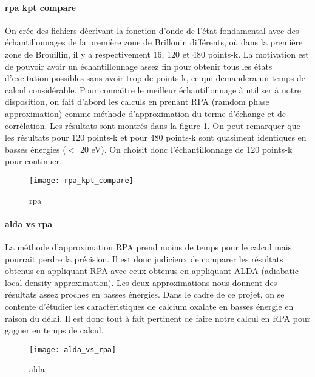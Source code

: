 
\paragraph{rpa kpt compare} 
On crée des fichiers décrivant la fonction d'onde de l'état fondamental avec des échantillonnages de la première zone de Brillouin différents, où dans la première zone de Brouillin, il y a respectivement 16, 120 et 480 points-k. 
La motivation est de pouvoir avoir un échantillonnage assez fin pour obtenir tous les états d'excitation possibles sans avoir trop de points-k, ce qui demandera un temps de calcul considérable.
Pour connaître le meilleur échantillonnage à utiliser à notre disposition, on fait d'abord les calculs en prenant RPA (ramdom phase approximation) comme méthode d'approximation du terme d'échange et de corrélation.
Les résultats sont montrés dans la figure \ref{kptCompare}. 
On peut remarquer que les résultats pour 120 points-k et pour 480 points-k sont quasiment identiques en basses énergies ($<$ 20 eV).
On choisit donc l'échantillonnage de 120 points-k pour continuer.

\begin{figure}[!h]\label{kptCompare}
    \centering
    \texttt{[image: rpa\_kpt\_compare]}
    \caption{rpa}
\end{figure}

\paragraph{alda vs rpa}\label{aldaRPA}
La méthode d'approximation RPA prend moins de temps pour le calcul mais pourrait perdre la précision. Il est donc judicieux de comparer les résultats obtenus en appliquant RPA avec ceux obtenus en appliquant ALDA (adiabatic local density approximation).
Les deux approximations nous donnent des résultats assez proches en basses énergies.
Dans le cadre de ce projet, on se contente d'étudier les caractéristiques de calcium oxalate en basses énergie en raison du délai.
Il est donc tout à fait pertinent de faire notre calcul en RPA pour gagner en temps de calcul.
\begin{figure}[!h]
    \centering
    \texttt{[image: alda\_vs\_rpa]}
    \caption{alda}
\end{figure}


